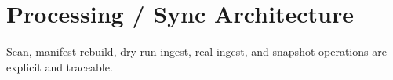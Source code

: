 \section{Processing / Sync Architecture}
Scan, manifest rebuild, dry-run ingest, real ingest, and snapshot operations are explicit and traceable.

